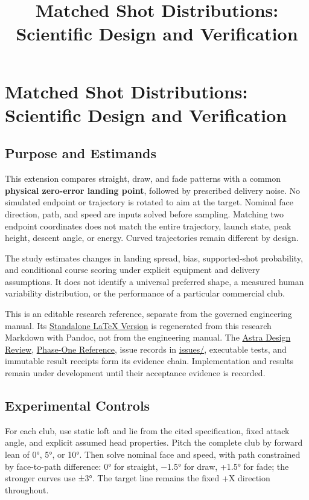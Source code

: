 \documentclass[
]{article}
\title{Matched Shot Distributions: Scientific Design and Verification}
\author{}
\date{}
\begin{document}
\maketitle

\section{Matched Shot Distributions: Scientific Design and
Verification}\label{matched-shot-distributions-scientific-design-and-verification}

\subsection{Purpose and Estimands}\label{purpose-and-estimands}

This extension compares straight, draw, and fade patterns with a common
\textbf{physical zero-error landing point}, followed by prescribed
delivery noise. No simulated endpoint or trajectory is rotated to aim at
the target. Nominal face direction, path, and speed are inputs solved
before sampling. Matching two endpoint coordinates does not match the
entire trajectory, launch state, peak height, descent angle, or energy.
Curved trajectories remain different by design.

The study estimates changes in landing spread, bias, supported-shot
probability, and conditional course scoring under explicit equipment and
delivery assumptions. It does not identify a universal preferred shape,
a measured human variability distribution, or the performance of a
particular commercial club.

This is an editable research reference, separate from the governed
engineering manual. Its \href{matched_delivery_reference.tex}{Standalone
LaTeX Version} is regenerated from this research Markdown with Pandoc,
not from the engineering manual. The \href{ASTRA_REVIEW.md}{Astra Design
Review}, \href{../README.md}{Phase-One Reference}, issue records in
\url{issues/}, executable tests, and immutable result receipts form its
evidence chain. Implementation and results remain under development
until their acceptance evidence is recorded.

\subsection{Experimental Controls}\label{experimental-controls}

For each club, use static loft and lie from the cited specification,
fixed attack angle, and explicit assumed head properties. Pitch the
complete club by forward lean of 0°, 5°, or 10°. Then solve nominal face
and speed, with path constrained by face-to-path difference: 0° for
straight, −1.5° for draw, +1.5° for fade; the stronger curves use ±3°.
The target line remains the fixed +X direction throughout.
\end{document}
